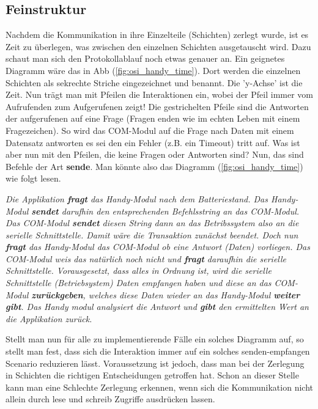 \documentclass[a4paper,10pt]{book}
\begin{document}
    \subsection{Feinstruktur}
    Nachdem die Kommunikation in ihre Einzelteile (Schichten) zerlegt wurde, 
    ist es Zeit zu überlegen, was zwischen den einzelnen Schichten 
    ausgetauscht wird. Dazu schaut man sich den Protokollablauf noch etwas 
    genauer an. Ein geignetes Diagramm wäre das in Abb 
    (\ref{fig:osi_handy_time}). Dort werden die einzelnen Schichten als 
    sekrechte Striche eingezeichnet und benannt. Die 'y-Achse' ist die Zeit. 
    Nun trägt man mit Pfeilen die Interaktionen ein, wobei der Pfeil immer
    vom Aufrufenden zum Aufgerufenen zeigt! Die gestrichelten Pfeile sind 
    die Antworten der aufgerufenen auf eine Frage (Fragen enden wie im
    echten Leben mit einem Fragezeichen). So wird das COM-Modul auf die
    Frage nach Daten mit einem Datensatz antworten es sei den ein Fehler
    (z.B. ein Timeout) tritt auf. Was ist aber nun mit den Pfeilen, die
    keine Fragen oder Antworten sind? Nun, das sind Befehle der Art 
    \textbf{sende}. Man könnte also das Diagramm (\ref{fig:osi_handy_time})
    wie folgt lesen. 
    
    \textit{ Die Applikation \textbf{fragt} das Handy-Modul nach dem
        Batteriestand. Das Handy-Modul \textbf{sendet} darufhin den 
        entsprechenden Befehlsstring an das COM-Modul. Das COM-Modul
        \textbf{sendet} diesen String dann an das Betribssystem also
        an die serielle Schnittstelle. Damit wäre die Transaktion 
        zunächst beendet. Doch nun \textbf{fragt} das Handy-Modul 
        das COM-Modul ob eine Antwort (Daten) vorliegen. Das 
        COM-Modul weis das natürlich noch nicht und \textbf{fragt}
        daraufhin die serielle Schnittstelle. Vorausgesetzt, dass alles in 
        Ordnung ist, wird die serielle Schnittstelle (Betriebsystem)
        Daten empfangen haben und diese an das COM-Modul \textbf{zurückgeben},
        welches diese Daten wieder an das Handy-Modul \textbf{weiter gibt}.
        Das Handy modul analysiert die Antwort und \textbf{gibt} den 
        ermittelten Wert an die Applikation zurück.
    }
    
    Stellt man nun für alle zu implementierende Fälle ein solches Diagramm auf, 
    so stellt man fest, dass sich die Interaktion immer auf ein solches 
    senden-empfangen Scenario reduzieren lässt. Voraussetzung ist jedoch,
    dass man bei der Zerlegung in Schichten die richtigen Entscheidungen 
    getroffen hat. Schon an dieser Stelle kann man eine Schlechte Zerlegung
    erkennen, wenn sich die Kommunikation nicht allein durch lese und schreib
    Zugriffe ausdrücken lassen. 
    
\end{document}
